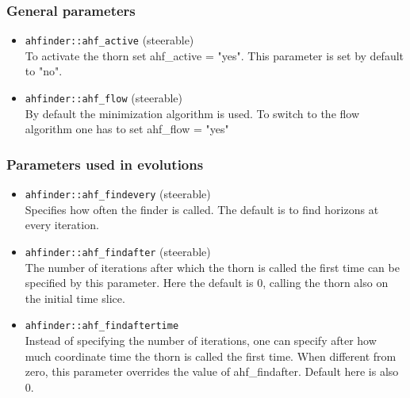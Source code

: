 \subsubsection*{General parameters}
\begin{itemize}
\item {\tt ahfinder::ahf\_active} (steerable) \\
        To activate the thorn set ahf\_active = "yes". This parameter is set
        by default to "no". \\
\item {\tt ahfinder::ahf\_flow} (steerable) \\
        By default the minimization algorithm is used. To switch to the
        flow algorithm one has to set ahf\_flow = "yes"
\end{itemize}
\subsubsection*{Parameters used in evolutions}
\begin{itemize}
\item {\tt ahfinder::ahf\_findevery} (steerable) \\
        Specifies how often the finder is called. The default is to find
        horizons at every iteration.
\item {\tt ahfinder::ahf\_findafter} (steerable) \\
        The number of iterations after which the thorn is called the
        first time can be specified by this parameter. Here the default is 0,
        calling the thorn also on the initial time slice.
\item {\tt ahfinder::ahf\_findaftertime} \\
        Instead of specifying the number of iterations, one can specify
        after how much coordinate time the thorn is called the first time.
        When different from zero, this parameter overrides the value of
        ahf\_findafter. Default here is also 0.
\end{itemize}
